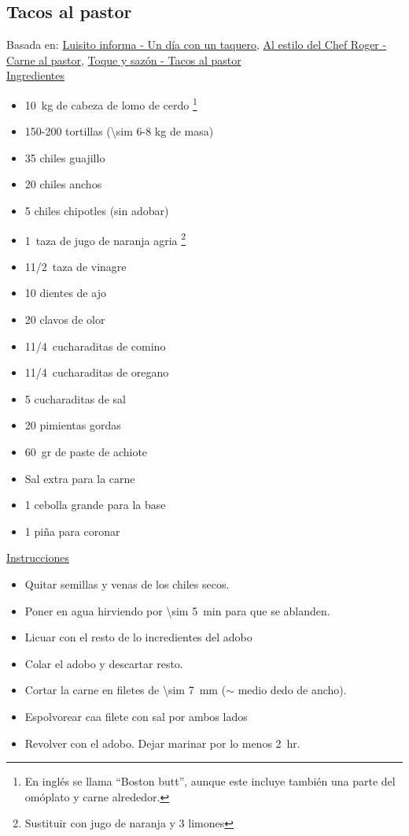 \subsection{Tacos al pastor}

Basada en: \href{https://www.youtube.com/watch?v=W03EIyBCOPI&list=LL70vwP7i8PV9gx3t6SvBbRQ&index=598}{Luisito informa - Un día con un taquero}, \href{https://www.youtube.com/watch?v=F7N3l6XGn-0}{Al estilo del Chef Roger - Carne al pastor},
\href{https://www.youtube.com/watch?v=pmzl92R3rJk}{Toque y sazón - Tacos al pastor}\\

\underline{Ingredientes}

\begin{itemize}
\item \SI{10}{kg} de cabeza de lomo de cerdo \footnote{En inglés se llama ``Boston butt'', aunque este incluye también una parte del omóplato y carne alrededor.}
\item 150-200 tortillas (\num{\sim 6}-8 kg de masa)
\item 35 chiles guajillo
\item 20 chiles anchos
\item 5 chiles chipotles (sin adobar)
\item \SI{1}{taza} de jugo de naranja agria \footnote{Sustituir con jugo de naranja y 3 limones}
\item 1\SI{1/2}{taza} de vinagre
\item 10 dientes de ajo
\item 20 clavos de olor
\item 1\SI{1/4}{cucharaditas} de comino
\item 1\SI{1/4}{cucharaditas} de oregano
\item 5 cucharaditas de sal
\item 20 pimientas gordas
\item \SI{60}{gr} de paste de achiote
\item Sal extra para la carne
\item 1 cebolla grande para la base
\item 1 piña para coronar
\end{itemize}

\underline{Instrucciones}
\begin{itemize}
\item Quitar semillas y venas de los chiles secos.
\item Poner en agua hirviendo por \SI{\sim 5}{min} para que se ablanden.
\item Licuar con el resto de lo incredientes del adobo
\item Colar el adobo y descartar resto.
\item Cortar la carne en filetes de \SI{\sim 7}{mm} ($\sim$ medio dedo de ancho).
\item Espolvorear caa filete con sal por ambos lados
\item Revolver con el adobo. Dejar marinar por lo menos \SI{2}{hr}.
\end{itemize}

